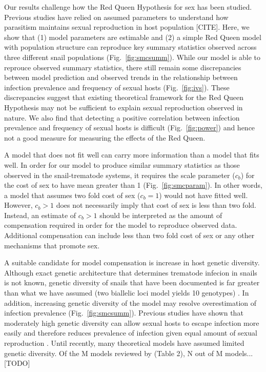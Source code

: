 \documentclass{article}\usepackage[]{graphicx}\usepackage[]{color}
\newcommand{\fref}[1]{Fig.~\ref{fig:#1}}
\begin{document}
Our results challenge how the Red Queen Hypothesis for sex has been studied.
Previous studies have relied on assumed parameters to understand how parasitism maintains sexual reproduction in host population [CITE].
Here, we show that (1) model parameters are estimable and (2) a simple Red Queen model with population structure can reproduce key summary statistics observed across three different snail populations (\fref{smcsumm}).
While our model is able to reprouce observed summary statistics, there still remain some discrepancies between model prediction and observed trends in the relationship between infection prevalence and frequency of sexual hosts (\fref{ivs}).
These discrepancies suggest that existing theoretical framework for the Red Queen Hypothesis may not be sufficient to explain sexual reproduction observed in nature.
We also find that detecting a positive correlation between infection prevalence and frequency of sexual hosts is difficult (\fref{power}) and hence not a good measure for measuring the effects of the Red Queen.

A model that does not fit well can carry more information than a model that fits well.
In order for our model to produce similar summary statistics as those observed in the snail-trematode systems, it requires the scale parameter ($c_b$) for the cost of sex to have mean greater than 1 (\fref{smcparam}).
In other words, a model that assumes two fold cost of sex ($c_b=1$) would not have fitted well.
However, $c_b > 1$ does not necessarily imply that cost of sex is less than two fold.
Instead, an estimate of $c_b > 1$ should be interpreted as the amount of compensation required in order for the model to reproduce observed data.
Additional compensation can include less than two fold cost of sex or any other mechanisms that promote sex.

A suitable candidate for model compensation is increase in host genetic diversity.
Although exact genetic architecture that determines trematode infecion in snails is not known, genetic diversity of snails that have been documented is far greater than what we have assumed (two biallelic loci model yields 10 genotypes) \citep{king2011parasites, dagan2013clonal}.
In addition, increasing genetic diversity of the model may resolve overestimation of infection prevalence (\fref{smcsumm}).
Previous studies have shown that moderately high genetic diversity can allow sexual hosts to escape infection more easily and therefore reduces prevalence of infection given equal amount of sexual reproduction \citep{lively2010effect, king2012does, ashby2015diversity}.
Until recently, many theoretical models have assumed limited genetic diversity.
Of the M models reviewed by \cite{ashby2015diversity} (Table 2), N out of M models... [TODO]
\end{document}
